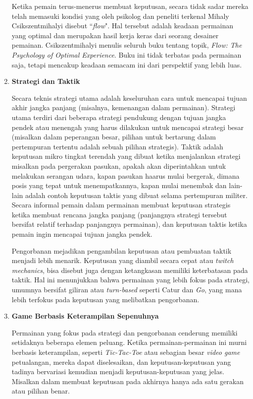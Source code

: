 \begin{subs}
\begin{enumerate}[label=\textbf{\alph*).}]
		Ketika pemain terus-menerus membuat keputusan, secara tidak sadar mereka telah memasuki kondisi yang oleh psikolog dan peneliti terkenal Mihaly Csikszentmihalyi disebut ``\textit{flow}". Hal tersebut adalah keadaan permainan yang optimal dan merupakan hasil kerja keras dari seorang desainer pemainan. Csikszentmihalyi menulis seluruh buku tentang topik, \textit{Flow: The Psychology of Optimal Experience}. Buku ini tidak terbatas pada permainan saja, tetapi mencakup keadaan semacam ini dari perspektif yang lebih luas.
		\vspace{1ex}
		
		\item \textbf{Strategi dan Taktik}
		
		Secara teknis strategi utama adalah keseluruhan cara untuk mencapai tujuan akhir jangka panjang (misalnya, kemenangan dalam permainan). Strategi utama terdiri dari beberapa strategi pendukung dengan tujuan jangka pendek atau menengah yang harus dilakukan untuk mencapai strategi besar (misalkan dalam peperangan besar, pilihan untuk bertarung dalam pertempuran tertentu adalah sebuah pilihan strategis). Taktik adalah keputusan mikro tingkat terendah yang dibuat ketika menjalankan strategi misalkan pada pergerakan pasukan, apakah akan diperintahkan untuk melakukan serangan udara, kapan pasukan haarus mulai bergerak, dimana posis yang tepat untuk menempatkannya, kapan mulai menembak dan lain-lain adalah contoh keputusan taktis yang dibuat selama pertempuran militer. Secara informal pemain dalam permainan membuat keputusan strategis ketika membuat rencana jangka panjang (panjangnya strategi tersebut bersifat relatif terhadap panjangnya permainan), dan keputusan taktis ketika pemain ingin mencapai tujuan jangka pendek.
		\vspace{1ex}
		
		Pengorbanan mejadikan pengambilan keputusan atau pembuatan taktik menjadi lebih menarik. Keputusan yang diambil secara cepat atau \textit{twitch mechanics}, bisa disebut juga dengan ketangkasan memiliki keterbatasan pada taktik. Hal ini menunjukkan bahwa permainan yang lebih fokus pada strategi, umumnya bersifat giliran atau \textit{turn-based} seperti Catur dan \textit{Go}, yang mana lebih terfokus pada keputusan yang melibatkan pengorbanan.
		\vspace{1ex}
		
		\item \textbf{Game Berbasis Keterampilan Sepenuhnya}
		
		Permainan yang fokus pada strategi dan pengorbanan cenderung memiliki setidaknya beberapa elemen peluang. Ketika permainan-permainan ini murni berbasis keterampilan, seperti \textit{Tic-Tac-Toe} atau sebagian besar \textit{video game} petualangan, mereka dapat diselesaikan, dan keputusan-keputusan yang tadinya bervariasi kemudian menjadi keputusan-keputusan yang jelas. Misalkan dalam membuat keputusan pada akhirnya hanya ada satu gerakan atau pilihan benar.
		\vspace{1ex}
		

\end{enumerate}
\end{subs}
